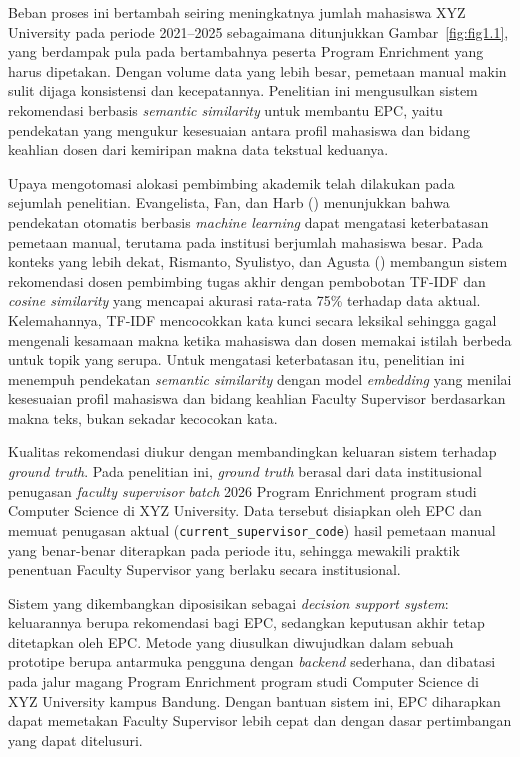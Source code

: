 Beban proses ini bertambah seiring meningkatnya jumlah mahasiswa XYZ University pada periode 2021--2025 sebagaimana ditunjukkan Gambar~\ref{fig:fig1.1}, yang berdampak pula pada bertambahnya peserta Program Enrichment yang harus dipetakan. Dengan volume data yang lebih besar, pemetaan manual makin sulit dijaga konsistensi dan kecepatannya. Penelitian ini mengusulkan sistem rekomendasi berbasis \textit{semantic similarity} untuk membantu EPC, yaitu pendekatan yang mengukur kesesuaian antara profil mahasiswa dan bidang keahlian dosen dari kemiripan makna data tekstual keduanya.

Upaya mengotomasi alokasi pembimbing akademik telah dilakukan pada sejumlah penelitian. Evangelista, Fan, dan Harb (\citeyear{fan2021automated}) menunjukkan bahwa pendekatan otomatis berbasis \textit{machine learning} dapat mengatasi keterbatasan pemetaan manual, terutama pada institusi berjumlah mahasiswa besar. Pada konteks yang lebih dekat, Rismanto, Syulistyo, dan Agusta (\citeyear{rismanto2020supervisor}) membangun sistem rekomendasi dosen pembimbing tugas akhir dengan pembobotan TF-IDF dan \textit{cosine similarity} yang mencapai akurasi rata-rata 75\% terhadap data aktual. Kelemahannya, TF-IDF mencocokkan kata kunci secara leksikal sehingga gagal mengenali kesamaan makna ketika mahasiswa dan dosen memakai istilah berbeda untuk topik yang serupa. Untuk mengatasi keterbatasan itu, penelitian ini menempuh pendekatan \textit{semantic similarity} dengan model \textit{embedding} yang menilai kesesuaian profil mahasiswa dan bidang keahlian Faculty Supervisor berdasarkan makna teks, bukan sekadar kecocokan kata.

Kualitas rekomendasi diukur dengan membandingkan keluaran sistem terhadap \textit{ground truth}. Pada penelitian ini, \textit{ground truth} berasal dari data institusional penugasan \textit{faculty supervisor} \textit{batch} 2026 Program Enrichment program studi Computer Science di XYZ University. Data tersebut disiapkan oleh EPC dan memuat penugasan aktual (\texttt{current\_supervisor\_code}) hasil pemetaan manual yang benar-benar diterapkan pada periode itu, sehingga mewakili praktik penentuan Faculty Supervisor yang berlaku secara institusional.

Sistem yang dikembangkan diposisikan sebagai \textit{decision support system}: keluarannya berupa rekomendasi bagi EPC, sedangkan keputusan akhir tetap ditetapkan oleh EPC. Metode yang diusulkan diwujudkan dalam sebuah prototipe berupa antarmuka pengguna dengan \textit{backend} sederhana, dan dibatasi pada jalur magang Program Enrichment program studi Computer Science di XYZ University kampus Bandung. Dengan bantuan sistem ini, EPC diharapkan dapat memetakan Faculty Supervisor lebih cepat dan dengan dasar pertimbangan yang dapat ditelusuri.

